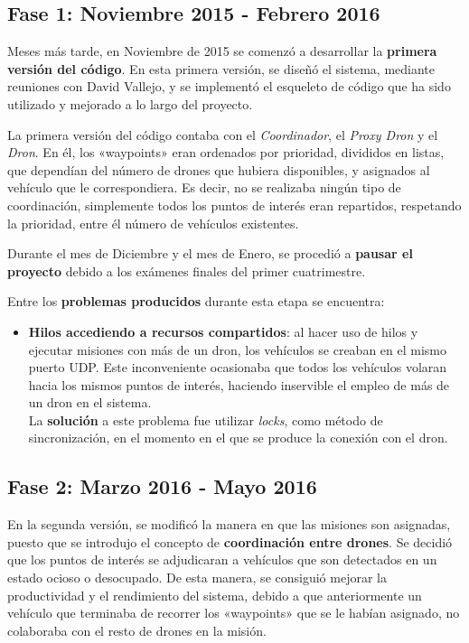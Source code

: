 \subsection{Fase 1: Noviembre 2015 - Febrero 2016}
\label{sec:segundaetapa}

Meses más tarde, en Noviembre de 2015 se comenzó a desarrollar la \textbf{primera versión del código}. En esta primera versión, se diseñó el sistema, mediante reuniones con David Vallejo, y se implementó el esqueleto de código que ha sido utilizado y mejorado a lo largo del proyecto. 

La primera versión del código contaba con el \textit{Coordinador}, el \textit{Proxy Dron} y el \textit{Dron}. En él, los «waypoints» eran ordenados por prioridad, divididos en listas, que dependían del número de drones que hubiera disponibles, y asignados al vehículo que le correspondiera. Es decir, no se realizaba ningún tipo de coordinación, simplemente todos los puntos de interés eran repartidos, respetando la prioridad, entre él número de vehículos existentes.

Durante el mes de Diciembre y el mes de Enero, se procedió a \textbf{pausar el proyecto} debido a los exámenes finales del primer cuatrimestre.

Entre los \textbf{problemas producidos} durante esta etapa se encuentra:
\begin{itemize}
\item \textbf{Hilos accediendo a recursos compartidos}: al hacer uso de hilos y ejecutar misiones con más de un dron, los vehículos se creaban en el mismo puerto UDP. Este inconveniente ocasionaba que todos los vehículos volaran hacia los mismos puntos de interés, haciendo inservible el empleo de más de un dron en el sistema. \\ La \textbf{solución} a este problema fue utilizar \textit{locks}, como método de sincronización, en el momento en el que se produce la conexión con el dron.
\end{itemize}

\subsection{Fase 2: Marzo 2016 - Mayo 2016}
\label{sec:terceraetapa}

En la segunda versión, se modificó la manera en que las misiones son asignadas, puesto que se introdujo el concepto de \textbf{coordinación entre drones}. Se decidió que los puntos de interés se adjudicaran a vehículos que son detectados en un estado ocioso o desocupado. De esta manera, se consiguió mejorar la productividad y el rendimiento del sistema, debido a que anteriormente un vehículo que terminaba de recorrer los «waypoints» que se le habían asignado, no colaboraba con el resto de drones en la misión. 

